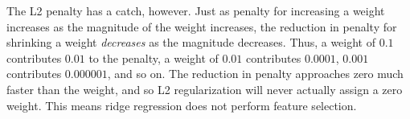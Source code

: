 The L2 penalty has a catch, however. Just as penalty for increasing a weight increases as the magnitude of the weight increases, the reduction in penalty for shrinking a weight {\em decreases} as the magnitude decreases. Thus, a weight of $0.1$ contributes $0.01$ to the penalty, a weight of $0.01$ contributes $0.0001$, $0.001$ contributes $0.000001$, and so on. The reduction in penalty approaches zero much faster than the weight, and so L2 regularization will never actually assign a zero weight. This means ridge regression does not perform feature selection.


